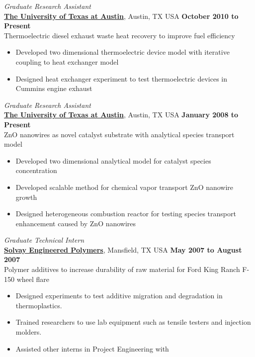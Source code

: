 \documentclass[centered]{res}
\begin{document}
\begin{resume}
\textit{Graduate Research Assistant} \\
\href{http://www.utexas.edu/}{\textbf{The University of Texas at
    Austin}}, Austin, TX USA%
\hfill \textbf{October 2010 to Present} \\
Thermoelectric diesel exhaust waste heat recovery to improve fuel
efficiency
\begin{itemize} \itemsep -2pt
\item Developed two dimensional thermoelectric device model with
  iterative coupling to heat exchanger model
\item Designed heat exchanger experiment to test thermoelectric
  devices in Cummins engine exhaust
\end{itemize} \vspace{-8pt}
%
\newpage
\textit{Graduate Research Assistant} \\
\href{http://www.utexas.edu/}{\textbf{The University of Texas at
    Austin}}, Austin, TX USA%
\hfill \textbf{January 2008 to Present} \\
ZnO nanowires as novel catalyst substrate with analytical species
transport model
\begin{itemize} \itemsep -2pt %
\item Developed two dimensional analytical model for catalyst
  species concentration
\item Developed scalable method for chemical vapor transport ZnO
  nanowire growth
\item Designed heterogeneous combustion reactor for testing species
  transport enhancement caused by ZnO nanowires
\end{itemize} \vspace{-8pt}
%
\textit{Graduate Technical Intern} \\
\href{http://www.lyondellbasell.com/LandingPages/SolvayEngineeredPolymers}{\textbf{Solvay
    Engineered Polymers}}, Mansfield, TX USA 
\hfill \textbf{May 2007 to August 2007} \\
Polymer additives to increase durability of raw material for Ford King
Ranch F-150 wheel flare
\begin{itemize} \itemsep -2pt %
\item Designed experiments to test additive migration
  and degradation in thermoplastics.
\item Trained researchers to use lab equipment such as tensile
  testers and injection molders.
\item Assisted other interns in Project Engineering with

\end{itemize}
\end{resume}
\end{document}
